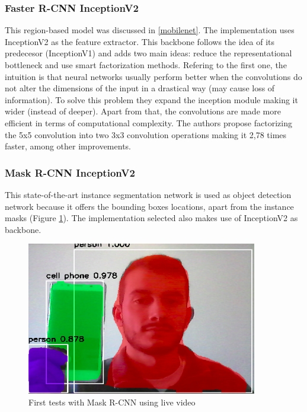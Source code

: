 \subsubsection{Faster R-CNN InceptionV2}
This region-based model was discussed in \ref{mobilenet}. The implementation uses InceptionV2 \cite{szegedy2016rethinking} as the feature extractor. This backbone follows the idea of its predecesor (InceptionV1) and adds two main ideas: reduce the representational bottleneck and use smart factorization methods. Refering to the first one, the intuition is that neural networks usually perform better when the convolutions do not alter the dimensions of the input in a drastical way (may cause loss of information). To solve this problem they expand the inception module making it wider (instead of deeper). Apart from that, the convolutions are made more efficient in terms of computational complexity. The authors propose factorizing the 5x5 convolution into two 3x3 convolution operations making it 2,78 times faster, among other improvements.
\subsubsection{Mask R-CNN InceptionV2}
This state-of-the-art instance segmentation network is used as object detection network because it offers the bounding boxes locations, apart from the instance masks (Figure \ref{fig:maskrcnn_tests}). The implementation selected also makes use of InceptionV2 as backbone.
\begin{figure}[H]
\begin{center}
\includegraphics[scale=0.5]{figures/maskrcnn_first_tests.png}
\caption{First tests with Mask R-CNN using live video}
\label{fig:maskrcnn_tests}
\end{center}
\end{figure} 
